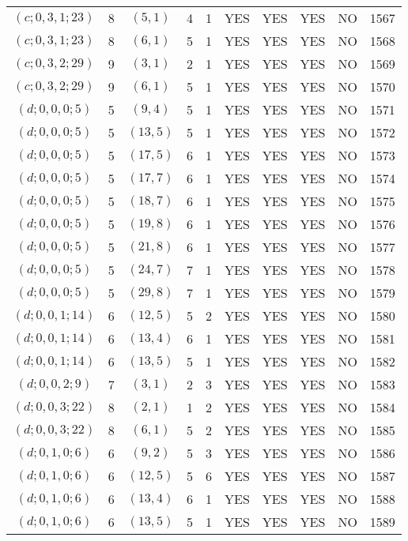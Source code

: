 \begin{longtable}{|c|c|c|c|c|c|c|c|c|c|}
$(c; 0, 3, 1; 23)$ & 8 & $(5, 1)$ & 4 & 1 & YES & YES & YES & NO & 1567\\
$(c; 0, 3, 1; 23)$ & 8 & $(6, 1)$ & 5 & 1 & YES & YES & YES & NO & 1568\\
$(c; 0, 3, 2; 29)$ & 9 & $(3, 1)$ & 2 & 1 & YES & YES & YES & NO & 1569\\
$(c; 0, 3, 2; 29)$ & 9 & $(6, 1)$ & 5 & 1 & YES & YES & YES & NO & 1570\\
$(d; 0, 0, 0; 5)$ & 5 & $(9, 4)$ & 5 & 1 & YES & YES & YES & NO & 1571\\
$(d; 0, 0, 0; 5)$ & 5 & $(13, 5)$ & 5 & 1 & YES & YES & YES & NO & 1572\\
$(d; 0, 0, 0; 5)$ & 5 & $(17, 5)$ & 6 & 1 & YES & YES & YES & NO & 1573\\
$(d; 0, 0, 0; 5)$ & 5 & $(17, 7)$ & 6 & 1 & YES & YES & YES & NO & 1574\\
$(d; 0, 0, 0; 5)$ & 5 & $(18, 7)$ & 6 & 1 & YES & YES & YES & NO & 1575\\
$(d; 0, 0, 0; 5)$ & 5 & $(19, 8)$ & 6 & 1 & YES & YES & YES & NO & 1576\\
$(d; 0, 0, 0; 5)$ & 5 & $(21, 8)$ & 6 & 1 & YES & YES & YES & NO & 1577\\
$(d; 0, 0, 0; 5)$ & 5 & $(24, 7)$ & 7 & 1 & YES & YES & YES & NO & 1578\\
$(d; 0, 0, 0; 5)$ & 5 & $(29, 8)$ & 7 & 1 & YES & YES & YES & NO & 1579\\
$(d; 0, 0, 1; 14)$ & 6 & $(12, 5)$ & 5 & 2 & YES & YES & YES & NO & 1580\\
$(d; 0, 0, 1; 14)$ & 6 & $(13, 4)$ & 6 & 1 & YES & YES & YES & NO & 1581\\
$(d; 0, 0, 1; 14)$ & 6 & $(13, 5)$ & 5 & 1 & YES & YES & YES & NO & 1582\\
$(d; 0, 0, 2; 9)$ & 7 & $(3, 1)$ & 2 & 3 & YES & YES & YES & NO & 1583\\
$(d; 0, 0, 3; 22)$ & 8 & $(2, 1)$ & 1 & 2 & YES & YES & YES & NO & 1584\\
$(d; 0, 0, 3; 22)$ & 8 & $(6, 1)$ & 5 & 2 & YES & YES & YES & NO & 1585\\
$(d; 0, 1, 0; 6)$ & 6 & $(9, 2)$ & 5 & 3 & YES & YES & YES & NO & 1586\\
$(d; 0, 1, 0; 6)$ & 6 & $(12, 5)$ & 5 & 6 & YES & YES & YES & NO & 1587\\
$(d; 0, 1, 0; 6)$ & 6 & $(13, 4)$ & 6 & 1 & YES & YES & YES & NO & 1588\\
$(d; 0, 1, 0; 6)$ & 6 & $(13, 5)$ & 5 & 1 & YES & YES & YES & NO & 1589\\

\end{longtable}
